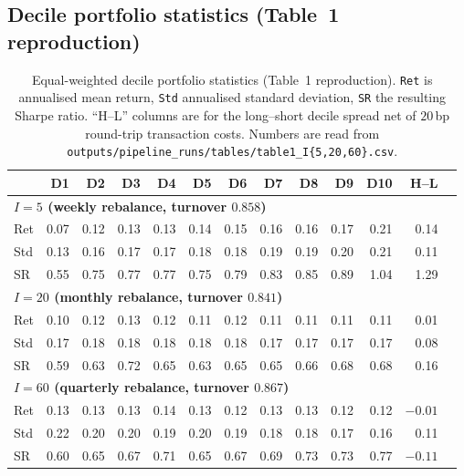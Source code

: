 \documentclass{article}
\begin{document}
\subsection{Decile portfolio statistics (Table~1 reproduction)}

\begin{table}[t]
  \centering
  \caption{Equal-weighted decile portfolio statistics (Table~1 reproduction).
    \texttt{Ret} is annualised mean return, \texttt{Std} annualised standard
    deviation, \texttt{SR} the resulting Sharpe ratio. ``H--L'' columns
    are for the long--short decile spread net of $20$\,bp round-trip
    transaction costs. Numbers are read from
    \texttt{outputs/pipeline\_runs/tables/table1\_I\{5,20,60\}.csv}.}
  \label{tab:table1}
  \small
  \begin{tabular}{l rrrrrrrrrrr r}
    \toprule
       & D1 & D2 & D3 & D4 & D5 & D6 & D7 & D8 & D9 & D10 & H--L \\
    \midrule
    \multicolumn{12}{l}{\textbf{$I=5$ (weekly rebalance, turnover $0.858$)}}\\
    Ret & 0.07 & 0.12 & 0.13 & 0.13 & 0.14 & 0.15 & 0.16 & 0.16 & 0.17 & 0.21 & 0.14 \\
    Std & 0.13 & 0.16 & 0.17 & 0.17 & 0.18 & 0.18 & 0.19 & 0.19 & 0.20 & 0.21 & 0.11 \\
    SR  & 0.55 & 0.75 & 0.77 & 0.77 & 0.75 & 0.79 & 0.83 & 0.85 & 0.89 & 1.04 & 1.29 \\
    \midrule
    \multicolumn{12}{l}{\textbf{$I=20$ (monthly rebalance, turnover $0.841$)}}\\
    Ret & 0.10 & 0.12 & 0.13 & 0.12 & 0.11 & 0.12 & 0.11 & 0.11 & 0.11 & 0.11 & 0.01 \\
    Std & 0.17 & 0.18 & 0.18 & 0.18 & 0.18 & 0.18 & 0.17 & 0.17 & 0.17 & 0.17 & 0.08 \\
    SR  & 0.59 & 0.63 & 0.72 & 0.65 & 0.63 & 0.65 & 0.65 & 0.66 & 0.68 & 0.68 & 0.16 \\
    \midrule
    \multicolumn{12}{l}{\textbf{$I=60$ (quarterly rebalance, turnover $0.867$)}}\\
    Ret & 0.13 & 0.13 & 0.13 & 0.14 & 0.13 & 0.12 & 0.13 & 0.13 & 0.12 & 0.12 & $-0.01$ \\
    Std & 0.22 & 0.20 & 0.20 & 0.19 & 0.20 & 0.19 & 0.18 & 0.18 & 0.17 & 0.16 & 0.11 \\
    SR  & 0.60 & 0.65 & 0.67 & 0.71 & 0.65 & 0.67 & 0.69 & 0.73 & 0.73 & 0.77 & $-0.11$ \\
    \bottomrule
  \end{tabular}
\end{table}
\end{document}

